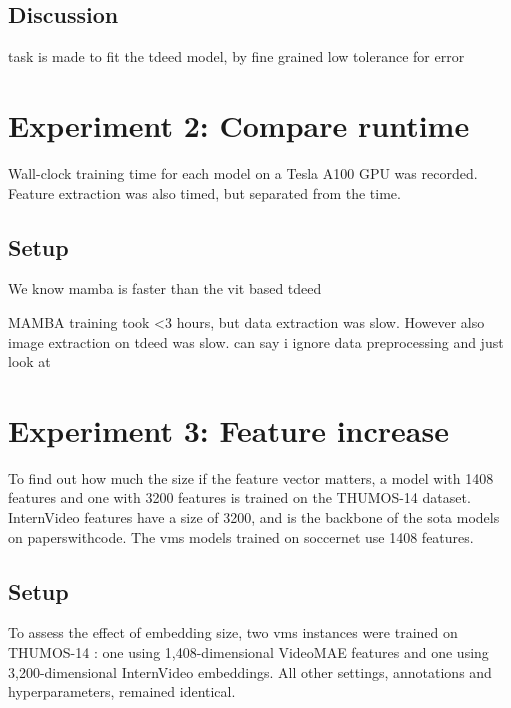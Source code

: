 \subsection{Discussion}
\label{ssec:ex1_discussion}

task is made to fit the tdeed model, by fine grained low tolerance for error 

\section{Experiment 2: Compare runtime}
\label{sec:experiment2}

Wall-clock training time for each model on a Tesla A100 GPU was recorded. Feature extraction was also timed, but separated from the time. 

\subsection{Setup}
\label{ssec:ex2_setup}

We know mamba is faster than the vit based tdeed

MAMBA training took <3 hours, but data extraction was slow. However also image extraction on tdeed was slow. can say i ignore data preprocessing and just look at 


\section{Experiment 3: Feature increase}
\label{sec:experiment3}
To find out how much the size if the feature vector matters, a model with 1408 features and one with 3200 features is trained on the THUMOS-14 dataset.
InternVideo features have a size of 3200, and is the backbone of the \acrshort{sota} models on paperswithcode.
The \acrshort{vms} models trained on soccernet use 1408 features. 


\subsection{Setup}
\label{ssec:ex3_setup}

To assess the effect of embedding size, two \acrshort{vms} instances were trained on THUMOS-14 \cite{dataset:thumos}: one using 1,408-dimensional VideoMAE features and one using 3,200-dimensional InternVideo embeddings. All other settings, annotations and hyperparameters, remained identical.

